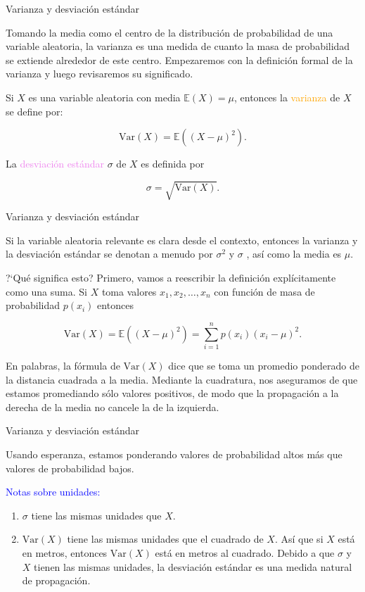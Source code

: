 \documentclass[10pt]{beamer}
\begin{document}
\begin{frame}{Varianza y desviaci\'on est\'andar}
\small{Tomando la media como el centro de la distribuci\'on de probabilidad de una variable aleatoria, la varianza es una medida de cuanto la masa de probabilidad se extiende alrededor de este centro. Empezaremos con la definici\'on formal de la varianza y luego revisaremos su significado.
	
Si $X$ es una variable aleatoria con media $\mathbb{E}(X) = \mu$, entonces la \textcolor{orange}{varianza} de $X$ se define por:

\[
\text{Var}(X) = \mathbb{E}((X - \mu)^2).
\]


La \textcolor{violet}{desviaci\'on est\'andar}  $\sigma$ de $X$ es definida por

\[
\sigma = \sqrt{\text{Var}(X)}.
\]
}
\end{frame}

\begin{frame}{Varianza y desviaci\'on est\'andar}
\small{Si la variable aleatoria relevante es clara desde el contexto, entonces la varianza y la desviación est\'andar se denotan a menudo por $\sigma^2$ y $\sigma$ , as\'i como la media es $\mu$.
	
?`Qu\'e significa esto? Primero, vamos a reescribir la definici\'on expl\'icitamente como una suma. Si $X$ toma valores $x_1, x_2,\dots, x _n$  con funci\'on de masa de probabilidad $p(x_i)$ entonces
		
\[
\text{Var}(X) = \mathbb{E}((X - \mu)^2) = \sum_{i =1}^{n}p(x_i)(x_i - \mu)^2.
\]

En palabras, la f\'ormula de $\text{Var}(X)$ dice que se toma  un promedio ponderado de la distancia cuadrada a la media. Mediante la cuadratura, nos aseguramos de que estamos promediando s\'olo valores positivos, de modo que la propagaci\'on  a la derecha de la media no cancele la de la izquierda. }
\end{frame}

\begin{frame}{Varianza y desviaci\'on est\'andar}
\small{ Usando esperanza, estamos ponderando valores de probabilidad altos m\'as que valores de probabilidad bajos.

\vspace{0.3cm}
	
\textcolor{blue}{Notas sobre unidades:}


\begin{enumerate}
\item $\sigma $ tiene las mismas unidades que $X$.
\item $\text{Var}(X)$ tiene las mismas unidades que el cuadrado de $X$. As\'i que si $X$ est\'a en metros, entonces $\text{Var}(X)$ est\'a en metros al cuadrado. Debido a que $\sigma$ y $X$ tienen las mismas unidades, la desviaci\'on est\'andar es una medida natural de propagaci\'on.
\end{enumerate}
}
\end{frame}
\end{document}
